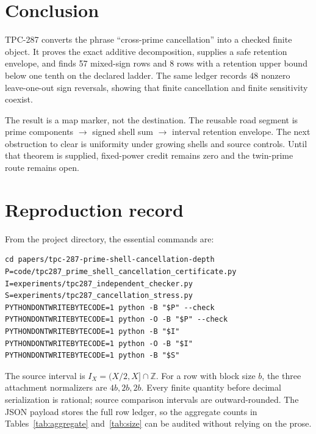 \documentclass[11pt]{article}
\newcommand{\1}{\mathbf{1}}
\begin{document}
\section{Conclusion}

TPC-287 converts the phrase ``cross-prime cancellation'' into a checked
finite object.  It proves the exact additive decomposition, supplies a safe
retention envelope, and finds 57 mixed-sign rows and 8 rows with a retention
upper bound below one tenth on the declared ladder.  The same ledger records
48 nonzero leave-one-out sign reversals, showing that finite cancellation and
finite sensitivity coexist.

The result is a map marker, not the destination.  The reusable road segment is
prime components $\to$ signed shell sum $\to$ interval retention envelope.
The next obstruction to clear is uniformity under growing shells and source
controls.  Until that theorem is supplied, fixed-power credit remains zero
and the twin-prime route remains open.

\appendix
\section{Reproduction record}

From the project directory, the essential commands are:
\begin{verbatim}
cd papers/tpc-287-prime-shell-cancellation-depth
P=code/tpc287_prime_shell_cancellation_certificate.py
I=experiments/tpc287_independent_checker.py
S=experiments/tpc287_cancellation_stress.py
PYTHONDONTWRITEBYTECODE=1 python -B "$P" --check
PYTHONDONTWRITEBYTECODE=1 python -O -B "$P" --check
PYTHONDONTWRITEBYTECODE=1 python -B "$I"
PYTHONDONTWRITEBYTECODE=1 python -O -B "$I"
PYTHONDONTWRITEBYTECODE=1 python -B "$S"
\end{verbatim}

The source interval is $I_X=(X/2,X]\cap\mathbb Z$.  For a row with block
size $b$, the three attachment normalizers are $4b,2b,2b$.  Every finite
quantity before decimal serialization is rational; source comparison
intervals are outward-rounded.  The JSON payload stores the full row ledger,
so the aggregate counts in Tables~\ref{tab:aggregate} and~\ref{tab:size} can
be audited without relying on the prose.



\end{document}
